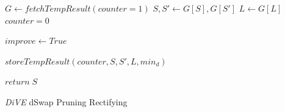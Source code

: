 \documentclass{article}
\begin{document}
\begin{algorithm}
{{			$ G \leftarrow fetchTempResult(counter=1)$\;
			$ S, S' \leftarrow G[S], G[S'] $ \;
			$ L \leftarrow G[L] $ \;
			$counter = 0 $\;
			
			$  improve \leftarrow  True $\;
			
			
		}{
			
			$ storeTempResult(counter, S, S', L, min_d)$\;
			
			
			
		}
		
		
		
		
	}
	$return\; S$
	\caption{\textit{DiVE} dSwap Pruning Rectifying}\label{DiVE-dSwap-Pruning-Rectifying}
\end{algorithm}
\end{document}
